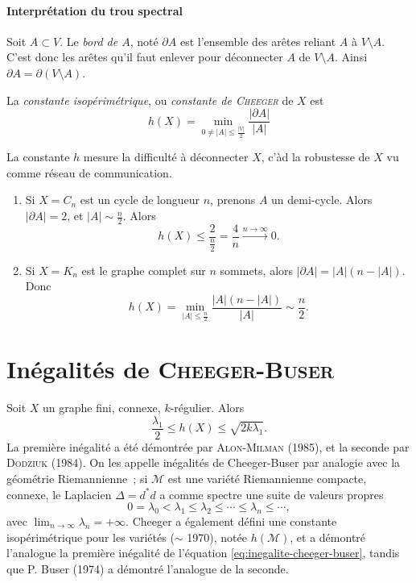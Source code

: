 \paragraph{Interprétation du trou spectral}

Soit $A \subset V$. Le \emph{bord de $A$}, noté $\partial A$ est l'ensemble des arêtes
reliant $A$ à $V \setminus A$. C'est donc les arêtes qu'il faut enlever pour déconnecter $A$ de $V \setminus
A$. Ainsi $\partial A = \partial (V \setminus A)$.

\begin{defi}
  La \emph{constante isopérimétrique}, ou \emph{constante de \textsc{Cheeger}} de $X$ est 
  \[ h(X) = \min_{0 \neq |A| \leq \frac{|V|}{2}} \frac{|\partial A|}{|A|} \]
\end{defi}

La constante $h$ mesure la difficulté à déconnecter $X$, c'àd la robustesse de $X$ vu comme réseau de
communication.

\begin{ex}
  \begin{enumerate}
  \item Si $X = C_n$ est un cycle de longueur $n$, prenons $A$ un demi-cycle. Alors $|\partial A| = 2$, et
    $|A| \sim \frac{n}{2}$. Alors 
    \[ h(X) \leq \frac{2}{\frac{n}{2}} = \frac{4}{n} \xrightarrow{n \to \infty} 0. \]
    
  \item Si $X = K_n$ est le graphe complet sur $n$ sommets, alors $|\partial A| = |A|(n - |A|)$. Donc 
    \[ h(X) = \min_{|A| \leq \frac{n}{2}} \frac{|A|(n - |A|)}{|A|} \sim \frac{n}{2}.  \]
  \end{enumerate}
\end{ex}


\section{Inégalités de \textsc{Cheeger-Buser}}

Soit $X$ un graphe fini, connexe, $k$-régulier. Alors 
\begin{equation}
  \label{eq:inegalite-cheeger-buser}
  \frac{\lambda_1}{2} \leq h(X) \leq \sqrt{2k \lambda_1}.
\end{equation}
La première inégalité a été démontrée par \textsc{Alon-Milman} (1985), et la seconde par \textsc{Dodziuk}
(1984). On les appelle \og inégalités de Cheeger-Buser\fg{} par analogie avec la géométrie Riemannienne~; si
$\mathcal{M}$ est une variété Riemannienne compacte, connexe, le Laplacien $ \Delta = d^\ast d  $ a comme
spectre une suite de valeurs propres 
\[ 0 = \lambda_0 < \lambda_1 \leq \lambda_2 \leq \cdots \leq \lambda_n \leq \cdots , \]
avec $\lim_{n \to \infty} \lambda_n = + \infty$. Cheeger a également défini une constante isopérimétrique pour
les variétés ($\sim$ 1970), notée $h(\mathcal{M})$, et a démontré l'analogue la première inégalité de
l'équation \eqref{eq:inegalite-cheeger-buser}, tandis que P. Buser (1974) a démontré l'analogue de la seconde.


